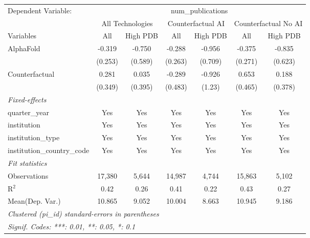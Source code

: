 \begingroup
\centering
\begin{tabular}{lcccccc}
   \tabularnewline \midrule \midrule
   Dependent Variable: & \multicolumn{6}{c}{num\_publications}\\
 & \multicolumn{2}{c}{All Technologies} & \multicolumn{2}{c}{Counterfactual AI} & \multicolumn{2}{c}{Counterfactual No AI} \\
\cmidrule(lr){1-1}\cmidrule(lr){2-3} \cmidrule(lr){4-5} \cmidrule(lr){6-7}
Variables & \multicolumn{1}{c}{All} & \multicolumn{1}{c}{High PDB} & \multicolumn{1}{c}{All} & \multicolumn{1}{c}{High PDB} & \multicolumn{1}{c}{All} & \multicolumn{1}{c}{High PDB} \\
\cmidrule(lr){1-1}\cmidrule(lr){2-2} \cmidrule(lr){3-3} \cmidrule(lr){4-4} \cmidrule(lr){5-5} \cmidrule(lr){6-6} \cmidrule(lr){7-7}
   AlphaFold                    & -0.319  & -0.750  & -0.288  & -0.956  & -0.375  & -0.835\\   
                                & (0.253) & (0.589) & (0.263) & (0.709) & (0.271) & (0.623)\\   
   Counterfactual               & 0.281   & 0.035   & -0.289  & -0.926  & 0.653   & 0.188\\   
                                & (0.349) & (0.395) & (0.483) & (1.23)  & (0.465) & (0.378)\\   
   \midrule
   \emph{Fixed-effects}\\
   quarter\_year                & Yes     & Yes     & Yes     & Yes     & Yes     & Yes\\  
   institution                  & Yes     & Yes     & Yes     & Yes     & Yes     & Yes\\  
   institution\_type            & Yes     & Yes     & Yes     & Yes     & Yes     & Yes\\  
   institution\_country\_code   & Yes     & Yes     & Yes     & Yes     & Yes     & Yes\\  
   \midrule
   \emph{Fit statistics}\\
   Observations                 & 17,380  & 5,644   & 14,987  & 4,744   & 15,863  & 5,102\\  
   R$^2$                        & 0.42    & 0.26    & 0.41    & 0.22    & 0.43    & 0.27\\  
Mean(Dep. Var.) & 10.865 & 9.052 & 10.004 & 8.663 & 10.945 & 9.186 \\
   \midrule \midrule
   \multicolumn{7}{l}{\emph{Clustered (pi\_id) standard-errors in parentheses}}\\
   \multicolumn{7}{l}{\emph{Signif. Codes: ***: 0.01, **: 0.05, *: 0.1}}\\
\end{tabular}
\par\endgroup
